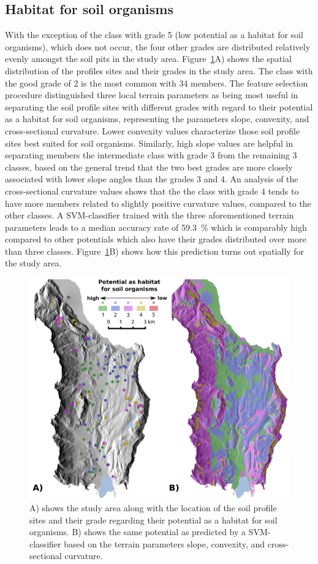 \documentclass[soilsystems,article,submit,moreauthors,pdftex,10pt,a4paper]{Definitions/mdpi}
\begin{document}
\subsection{Habitat for soil organisms}
With the exception of the class with grade 5 (low potential as a habitat for soil organisms), which does not occur, the four other grades are distributed relatively evenly amongst the soil pits in the study area. Figure~\ref{fig:Leben_org_predicted}A) shows the spatial distribution of the profiles sites and their grades in the study area. The class with the good grade of 2 is the most common with 34 members. The feature selection procedure distinguished three local terrain parameters as being most useful in separating the soil profile sites with different grades with regard to their potential as a habitat for  soil organisms, representing the parameters slope, convexity, and cross-sectional curvature. Lower convexity values characterize those soil profile sites best suited for soil organisms. Similarly, high slope values are helpful in separating members the intermediate class with grade 3 from the remaining 3 classes, based on the general trend that the two best grades are more closely associated with lower slope angles than the grades 3 and 4. An analysis of the cross-sectional curvature values shows that the  the class with grade 4 tends to have more members related to slightly positive curvature values, compared to the other classes. A SVM-classifier trained with the three aforementioned terrain parameters leads to a median accuracy rate of 59.3~\% which is comparably high compared to other potentials which also have their grades distributed over more than three classes. Figure~\ref{fig:Leben_org_predicted}B) shows how this prediction turns out spatially for the study area.
\begin{figure}[ht!]
\includegraphics[width=\textwidth,angle=0]{Leben_org_predict.pdf}
\caption{A) shows the study area along with the location of the soil profile sites and their grade regarding their potential as a habitat for soil organisms. B) shows the same potential as predicted by a SVM-classifier based on the terrain parameters  slope, convexity, and cross-sectional curvature.}
\label{fig:Leben_org_predicted}
\end{figure}
\end{document}

